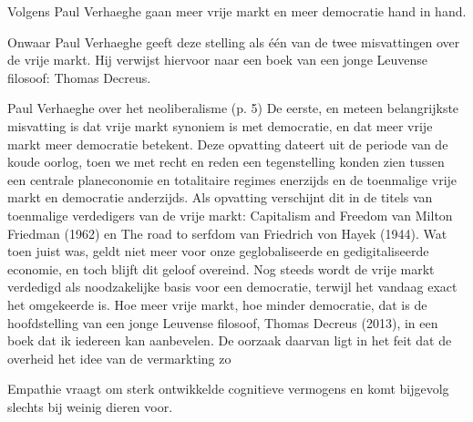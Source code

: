 \documentclass[main.tex]{subfiles}
\begin{document}
\begin{examenvraag}
    \begin{stelling}
        Volgens Paul Verhaeghe gaan meer vrije markt en meer democratie hand in hand.
    \end{stelling}

    \begin{stelling-antwoord}{Onwaar}
        Paul Verhaeghe geeft deze stelling als \'e\'en van de twee misvattingen over de vrije markt.
        Hij verwijst hiervoor naar een boek van een jonge Leuvense filosoof: Thomas Decreus.
        \begin{citaat}{Paul Verhaeghe over het neoliberalisme (p. 5)}
            De eerste, en meteen belangrijkste misvatting is dat vrije markt synoniem is met democratie, en dat meer vrije markt meer democratie betekent.
            Deze opvatting dateert uit de periode van de koude oorlog, toen we met recht en reden een tegenstelling konden zien tussen een centrale planeconomie en totalitaire regimes enerzijds en de toenmalige vrije markt en democratie anderzijds.
            Als opvatting verschijnt dit in de titels van toenmalige verdedigers van de vrije markt: Capitalism and Freedom van Milton Friedman (1962) en The road to serfdom van Friedrich von Hayek (1944).
            Wat toen juist was, geldt niet meer voor onze geglobaliseerde en gedigitaliseerde economie, en toch blijft dit geloof overeind.
            Nog steeds wordt de vrije markt verdedigd als noodzakelijke basis voor een democratie, terwijl het vandaag exact het omgekeerde is.
            Hoe meer vrije markt, hoe minder democratie, dat is de hoofdstelling van een jonge Leuvense filosoof, Thomas Decreus (2013), in een boek dat ik iedereen kan aanbevelen.
            De oorzaak daarvan ligt in het feit dat de overheid het idee van de vermarkting zo
        \end{citaat}
    \end{stelling-antwoord}
\end{examenvraag}


\begin{examenvraag}
    \begin{stelling}
        Empathie vraagt om sterk ontwikkelde cognitieve vermogens en komt bijgevolg slechts bij weinig dieren voor.
    \end{stelling}

    \begin{antwoord}
    \end{antwoord}
\end{examenvraag}
\end{document}
